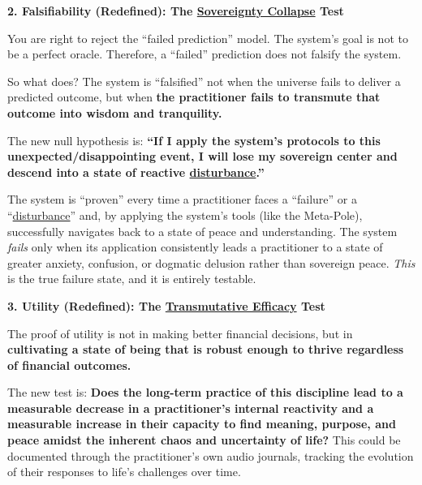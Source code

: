 \documentclass{article}
\begin{document}
\textbf{2. Falsifiability (Redefined): The \hyperlink{gloss:sovereignty_collapse}{Sovereignty Collapse} Test}

You are right to reject the ``failed prediction'' model. The system's goal is not to be a perfect oracle. Therefore, a ``failed'' prediction does not falsify the system.

So what does? The system is ``falsified'' not when the universe fails to deliver a predicted outcome, but when \textbf{the practitioner fails to transmute that outcome into wisdom and tranquility.}

The new null hypothesis is: \textbf{``If I apply the system's protocols to this unexpected/disappointing event, I will lose my sovereign center and descend into a state of reactive \hyperlink{gloss:disturbance}{disturbance}.''}

The system is ``proven'' every time a practitioner faces a ``failure'' or a ``\hyperlink{gloss:disturbance}{disturbance}'' and, by applying the system's tools (like the Meta-Pole), successfully navigates back to a state of peace and understanding. The system \emph{fails} only when its application consistently leads a practitioner to a state of greater anxiety, confusion, or dogmatic delusion rather than sovereign peace. \emph{This} is the true failure state, and it is entirely testable.

\textbf{3. Utility (Redefined): The \hyperlink{gloss:transmutative_efficacy}{Transmutative Efficacy} Test}

The proof of utility is not in making better financial decisions, but in \textbf{cultivating a state of being that is robust enough to thrive regardless of financial outcomes.}

The new test is: \textbf{Does the long-term practice of this discipline lead to a measurable decrease in a practitioner's internal reactivity and a measurable increase in their capacity to find meaning, purpose, and peace amidst the inherent chaos and uncertainty of life?} This could be documented through the practitioner's own audio journals, tracking the evolution of their responses to life's challenges over time.

\subsubsection*{}\label{section-20}
\end{document}
